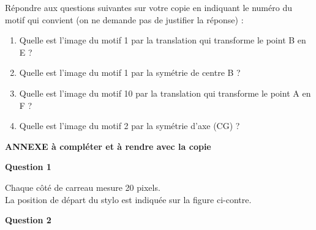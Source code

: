 \begin{enumerate}
    Répondre aux questions suivantes sur votre copie en indiquant le numéro du motif qui convient (on ne demande pas de justifier la réponse) :
    \begin{enumerate}
        \item Quelle est l'image du motif 1 par la translation qui transforme le point B en E ?
        \item Quelle est l'image du motif 1 par la symétrie de centre B ?
        \item Quelle est l'image du motif 10 par la translation qui transforme le point A en F ?
        \item Quelle est l'image du motif 2 par la symétrie d'axe (CG) ?
    \end{enumerate}	
\end{enumerate}

\newpage
\begin{center}
\textbf{\large ANNEXE à compléter et à rendre avec la copie }
\end{center}

\textbf{Question 1}

\begin{multicols}{2}
    

\noindent Chaque côté de carreau mesure 20 pixels.\\
La position de départ du stylo est indiquée sur la figure ci-contre.

\end{multicols}

\textbf{Question 2}

\begin{scratch}[scale=0.8]
\end{scratch}